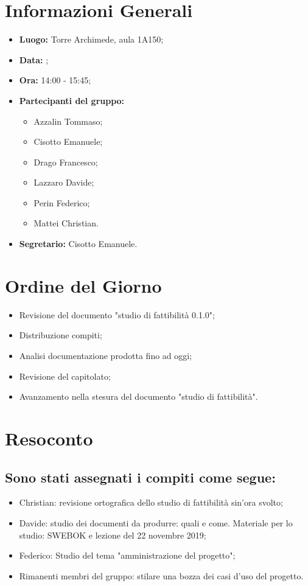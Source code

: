 \section{Informazioni Generali}
\begin{itemize}
\item \textbf{Luogo:} Torre Archimede, aula 1A150;
\item \textbf{Data:} \Data;
\item \textbf{Ora:} 14:00 - 15:45;
\item \textbf{Partecipanti del gruppo:}
	\begin{itemize}
	\item Azzalin Tommaso; 
	\item Cisotto Emanuele; 
	\item Drago Francesco;
	\item Lazzaro Davide;
	\item Perin Federico;
	\item Mattei Christian.
	\end{itemize} 
\item \textbf{Segretario:} Cisotto Emanuele.
\end{itemize}

\clearpage

\section{Ordine del Giorno}
\begin{itemize}
\item Revisione del documento "studio di fattibilità 0.1.0";
\item Distribuzione compiti;
\item Analisi documentazione prodotta fino ad oggi;
\item Revisione del capitolato;
\item Avanzamento nella stesura del documento "studio di fattibilità".
\end{itemize}

\clearpage

\section{Resoconto}

\subsection{Sono stati assegnati i compiti come segue:}
\begin{itemize}
\item Christian: revisione ortografica dello studio di fattibilità sin'ora svolto;
\item Davide: studio dei documenti da produrre: quali e come. Materiale per lo studio: SWEBOK e lezione del 22 novembre 2019;
\item Federico: Studio del tema "amministrazione del progetto";
\item Rimanenti membri del gruppo: stilare una bozza dei casi d'uso del progetto.
\end{itemize} 
\clearpage